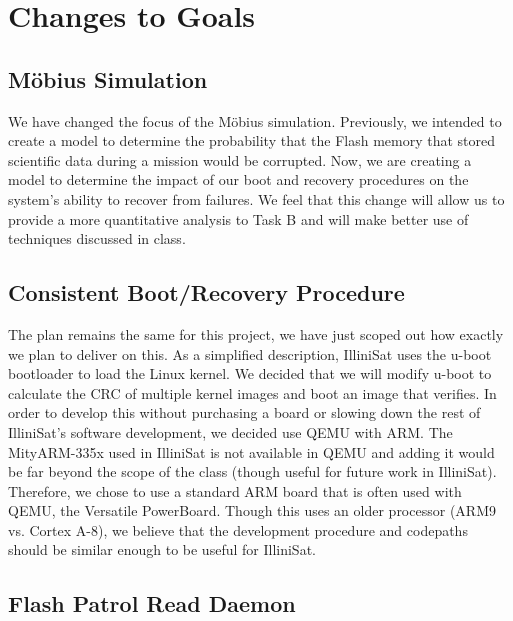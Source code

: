 \section{Changes to Goals} 

\subsection{M\"obius Simulation}
We have changed the focus of the M\"obius simulation.  Previously, we intended to create a model to determine the probability that the Flash memory that stored scientific data during a mission would be corrupted.  Now, we are creating a model to determine the impact of our boot and recovery procedures on the system's ability to recover from failures.  We feel that this change will allow us to provide a more quantitative analysis to Task B and will make better use of techniques discussed in class.

\subsection{Consistent Boot/Recovery Procedure}
The plan remains the same for this project, we have just scoped out how exactly
we plan to deliver on this. As a simplified description, IlliniSat uses the
u-boot bootloader to load the Linux kernel.  We decided that we will modify
u-boot to calculate the CRC of multiple kernel images and boot an image that
verifies.  In order to develop this without purchasing a board or slowing down
the rest of IlliniSat's software development, we decided use QEMU with ARM. The
MityARM-335x used in IlliniSat is not available in QEMU and adding it would be
far beyond the scope of the class (though useful for future work in IlliniSat).
Therefore, we chose to use a standard ARM board that is often used with QEMU,
the Versatile PowerBoard.  Though this uses an older processor (ARM9 vs. Cortex
A-8), we believe that the development procedure and codepaths should be similar
enough to be useful for IlliniSat.


\subsection{Flash Patrol Read Daemon}

